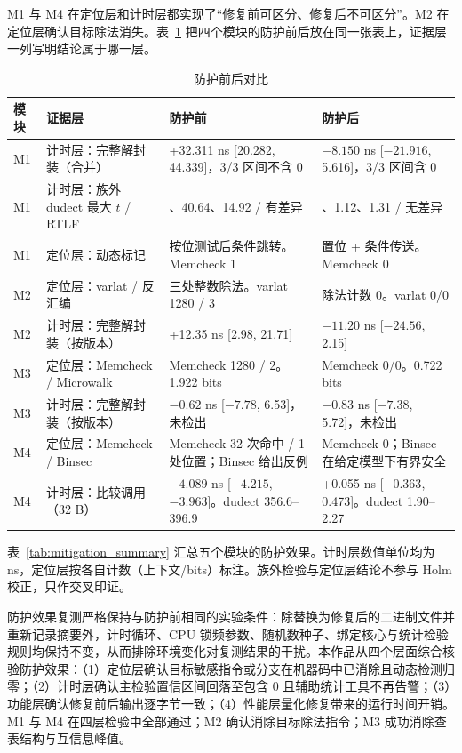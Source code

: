 M1 与 M4 在定位层和计时层都实现了“修复前可区分、修复后不可区分”。M2 在定位层确认目标除法消失。表~\ref{tab:beforeafter} 把四个模块的防护前后放在同一张表上，证据层一列写明结论属于哪一层。%

\begin{table}[H]
\centering
\caption{防护前后对比}
\label{tab:beforeafter}
{\small
\begin{tabularx}{\textwidth}{|>{\raggedright\arraybackslash}p{1.2cm}|>{\raggedright\arraybackslash}p{3.5cm}|>{\raggedright\arraybackslash}p{5.2cm}|>{\raggedright\arraybackslash}X|}
\hline
模块 & 证据层 & 防护前 & 防护后 \\
\hline
M1 & 计时层：完整解封装（合并） & +32.311 ns [20.282, 44.339]，3/3 区间不含 0 & $-8.150$ ns [$-21.916$, 5.616]，3/3 区间含 0 \\
\hline
M1 & 计时层：族外 dudect 最大 $t$ / RTLF & 26.41、40.64、14.92 / 有差异 & 1.15、1.12、1.31 / 无差异 \\
\hline
M1 & 定位层：动态标记 & 按位测试后条件跳转。Memcheck 1 & 置位 + 条件传送。Memcheck 0 \\
\hline
M2 & 定位层：varlat / 反汇编 & 三处整数除法。varlat 1280 / 3 & 除法计数 0。varlat 0/0 \\
\hline
M2 & 计时层：完整解封装（按版本） & +12.35 ns [2.98, 21.71] & $-11.20$ ns [$-24.56$, 2.15] \\
\hline
M3 & 定位层：Memcheck / Microwalk & Memcheck 1280 / 2。1.922 bits & Memcheck 0/0。0.722 bits \\
\hline
M3 & 计时层：完整解封装（按版本） & $-0.62$ ns [$-7.78$, 6.53]，未检出 & $-0.83$ ns [$-7.38$, 5.72]，未检出 \\
\hline
M4 & 定位层：Memcheck / Binsec & Memcheck 32 次命中 / 1 处位置；Binsec 给出反例 & Memcheck 0；Binsec 在给定模型下有界安全 \\
\hline
M4 & 计时层：比较调用（32 B） & $-4.089$ ns [$-4.215$, $-3.963$]。dudect 356.6--396.9 & +0.055 ns [$-0.363$, 0.473]。dudect 1.90--2.27 \\
\hline
\end{tabularx}
}
\end{table}

表~\ref{tab:mitigation_summary} 汇总五个模块的防护效果。计时层数值单位均为 ns，定位层按各自计数（上下文/bits）标注。族外检验与定位层结论不参与 Holm 校正，只作交叉印证。

防护效果复测严格保持与防护前相同的实验条件：除替换为修复后的二进制文件并重新记录摘要外，计时循环、CPU 锁频参数、随机数种子、绑定核心与统计检验规则均保持不变，从而排除环境变化对复测结果的干扰。本作品从四个层面综合核验防护效果：（1）定位层确认目标敏感指令或分支在机器码中已消除且动态检测归零；（2）计时层确认主检验置信区间回落至包含 0 且辅助统计工具不再告警；（3）功能层确认修复前后输出逐字节一致；（4）性能层量化修复带来的运行时间开销。M1 与 M4 在四层检验中全部通过；M2 确认消除目标除法指令；M3 成功消除查表结构与互信息峰值。

